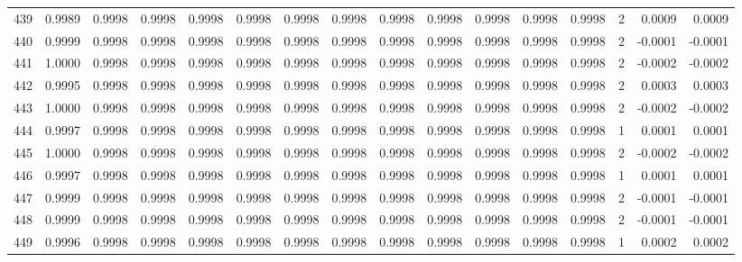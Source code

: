 \begin{tabular}{lrrrrrrrrrrrrrrr}
439 &      0.9989 &  0.9998 &  0.9998 &  0.9998 &  0.9998 &  0.9998 &  0.9998 &  0.9998 &  0.9998 &  0.9998 &   0.9998 &     0.9998 &      2 &                    0.0009 &                     0.0009 \\
440 &      0.9999 &  0.9998 &  0.9998 &  0.9998 &  0.9998 &  0.9998 &  0.9998 &  0.9998 &  0.9998 &  0.9998 &   0.9998 &     0.9998 &      2 &                   -0.0001 &                    -0.0001 \\
441 &      1.0000 &  0.9998 &  0.9998 &  0.9998 &  0.9998 &  0.9998 &  0.9998 &  0.9998 &  0.9998 &  0.9998 &   0.9998 &     0.9998 &      2 &                   -0.0002 &                    -0.0002 \\
442 &      0.9995 &  0.9998 &  0.9998 &  0.9998 &  0.9998 &  0.9998 &  0.9998 &  0.9998 &  0.9998 &  0.9998 &   0.9998 &     0.9998 &      2 &                    0.0003 &                     0.0003 \\
443 &      1.0000 &  0.9998 &  0.9998 &  0.9998 &  0.9998 &  0.9998 &  0.9998 &  0.9998 &  0.9998 &  0.9998 &   0.9998 &     0.9998 &      2 &                   -0.0002 &                    -0.0002 \\
444 &      0.9997 &  0.9998 &  0.9998 &  0.9998 &  0.9998 &  0.9998 &  0.9998 &  0.9998 &  0.9998 &  0.9998 &   0.9998 &     0.9998 &      1 &                    0.0001 &                     0.0001 \\
445 &      1.0000 &  0.9998 &  0.9998 &  0.9998 &  0.9998 &  0.9998 &  0.9998 &  0.9998 &  0.9998 &  0.9998 &   0.9998 &     0.9998 &      2 &                   -0.0002 &                    -0.0002 \\
446 &      0.9997 &  0.9998 &  0.9998 &  0.9998 &  0.9998 &  0.9998 &  0.9998 &  0.9998 &  0.9998 &  0.9998 &   0.9998 &     0.9998 &      1 &                    0.0001 &                     0.0001 \\
447 &      0.9999 &  0.9998 &  0.9998 &  0.9998 &  0.9998 &  0.9998 &  0.9998 &  0.9998 &  0.9998 &  0.9998 &   0.9998 &     0.9998 &      2 &                   -0.0001 &                    -0.0001 \\
448 &      0.9999 &  0.9998 &  0.9998 &  0.9998 &  0.9998 &  0.9998 &  0.9998 &  0.9998 &  0.9998 &  0.9998 &   0.9998 &     0.9998 &      2 &                   -0.0001 &                    -0.0001 \\
449 &      0.9996 &  0.9998 &  0.9998 &  0.9998 &  0.9998 &  0.9998 &  0.9998 &  0.9998 &  0.9998 &  0.9998 &   0.9998 &     0.9998 &      1 &                    0.0002 &                     0.0002 \\

\end{tabular}
